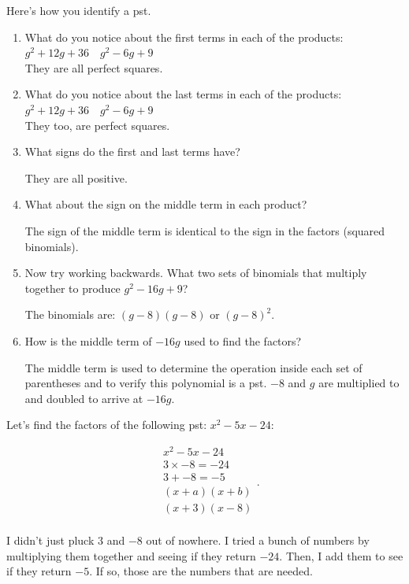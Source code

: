 Here's how you identify a \gls{pst}.

\begin{enumerate}
  \label{enum:dst_identification}

  \item What do you notice about the first terms in each of the products:
    $g^{2} + 12g + 36 \quad g^{2} - 6g + 9$ \\

    They are all perfect squares.

  \item What do you notice about the last terms in each of the products:
    $g^{2} + 12g + 36 \quad g^{2} - 6g + 9$ \\

    They too, are perfect squares.

  \item What signs do the first and last terms have?

    They are all positive.

  \item What about the sign on the middle term in each product?

    The sign of the middle term is identical to the sign in the factors
    (squared binomials).

  \item Now try working backwards. What two sets of binomials that multiply
    together to produce $g^{2} - 16g + 9$?

    The binomials are: $(g - 8)(g - 8)$ or $(g - 8)^{2}$.

  \item How is the middle term of $-16g$ used to find the factors?

    The middle term is used to determine the operation inside each set of
    parentheses and to verify this polynomial is a \gls{pst}. $-8$ and $g$ are
    multiplied to and doubled to arrive at $-16g$.
\end{enumerate}

\begin{example}
  \label{exm:dst_pattern}

  Let's find the factors of the following \gls{pst}: $x^{2} - 5x - 24$:

  \begin{equation}
    \label{eqt:dst_pattern_result}
    \begin{split}
      & x^{2} - 5x - 24 \\
      & 3 \times -8 = -24  \\
      & 3 + -8 = -5 \\
      & (x + a)(x + b) \\
      & \boxed{(x + 3)(x - 8)} \\
    \end{split}
  .\end{equation}

  I didn't just pluck $3$ and $-8$ out of nowhere. I tried a bunch of numbers by
  multiplying them together and seeing if they return $-24$. Then, I add them to
  see if they return $-5$. If so, those are the numbers that are needed.
\end{example}


\newpage
